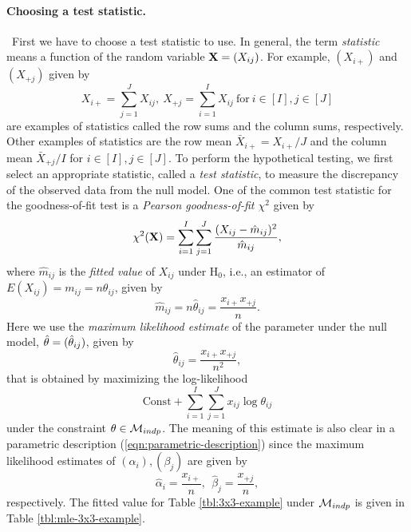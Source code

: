 \documentclass[12pt]{article}
\theoremstyle{definition}
\def\BX{{\bf X}}
\def\Btheta{{\bf \theta}}
\begin{document}
\paragraph*{Choosing a test statistic.}\ First we have to choose a test
statistic to use. In general, the term {\it statistic} means a
function of the
random variable $\BX = (X_{ij})$. For example, $(X_{i+})$ and $(X_{+j})$
given by
\[
 X_{i+} = \sum_{j = 1}^J X_{ij},\ 
 X_{+j} = \sum_{i = 1}^I X_{ij}\ \mbox{for}\ i \in [I], j \in [J]
\]
are examples of statistics called the row sums and the column sums,
respectively. Other examples of statistics are the row mean $\bar{X}_{i+} =
X_{i+}/J$ and the column mean $\bar{X}_{+j}/I$ for $i \in [I], j \in
[J]$. To perform the hypothetical testing, we first select an appropriate
statistic, called a {\it test statistic}, to measure the discrepancy
of the observed data from the null model. 
One of the common test statistic for the goodness-of-fit test is
a {\it Pearson goodness-of-fit $\chi^2$} given by
\[
 \chi^2(\BX) = \sum_{i = 1}^I\sum_{j = 1}^J\frac{(X_{ij} -
 \hat{m}_{ij})^2}{\hat{m}_{ij}},
\]
where $\hat{m}_{ij}$ is the {\it fitted value} of $X_{ij}$ under $\mbox{H}_0$, 
i.e., an estimator of $E(X_{ij}) = m_{ij} = n\theta_{ij}$, 
given by
\begin{equation}
 \hat{m}_{ij} = n\hat{\theta}_{ij} = \frac{x_{i+}x_{+j}}{n}.
\label{eqn:fitted-value-m}
\end{equation}
Here we use the {\it maximum likelihood estimate} of the parameter
under the null model,
$\hat{\Btheta} = (\hat{\theta}_{ij})$, given by
\begin{equation}
 \hat{\theta}_{ij} = \frac{x_{i+}x_{+j}}{n^2},
\label{eqn:MLE-under-indp-thetaij}
\end{equation}
that is obtained by maximizing the log-likelihood
\[
 \mbox{Const} + \sum_{i = 1}^I\sum_{j = 1}^Jx_{ij}\log\theta_{ij}
\]
under the constraint $\Btheta \in {\cal M}_{indp}$. The meaning of this
estimate is also clear in a parametric description
(\ref{eqn:parametric-description}) since the maximum likelihood estimates
of $(\alpha_i), (\beta_j)$ are given by
\[
 \hat{\alpha}_i = \frac{x_{i+}}{n},\ \ 
 \hat{\beta}_j = \frac{x_{+j}}{n},
\]
respectively. The fitted value for Table \ref{tbl:3x3-example} under
${\cal M}_{indp}$ is given in Table \ref{tbl:mle-3x3-example}.
\end{document}
